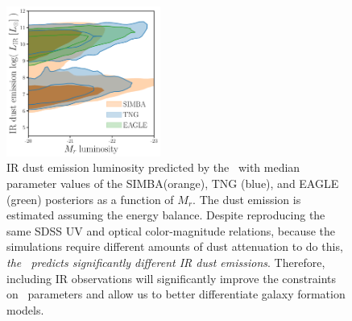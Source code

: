 


\begin{figure}
\begin{center}
    \includegraphics[width=0.45\textwidth]{figs/abc_Lir.pdf}
    \caption{\label{fig:lir}
    IR dust emission luminosity predicted by the \eda~with median parameter
    values of the SIMBA(orange), TNG (blue), and EAGLE (green) posteriors as a
    function of $M_r$. 
    The dust emission is estimated assuming the \cite{dacunha2008} energy balance.
    Despite reproducing the same SDSS UV and optical color-magnitude relations,
    because the simulations require different amounts of dust attenuation to do
    this, \emph{the \eda~predicts significantly different IR dust emissions}.
    Therefore, including IR observations will significantly improve the
    constraints on \eda~parameters and allow us to better differentiate galaxy
    formation models.
    }
\end{center}
\end{figure}

